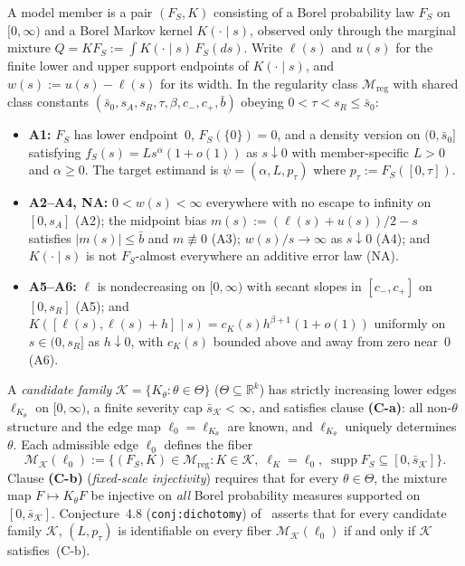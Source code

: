 \documentclass[11pt]{article}
\theoremstyle{plain}
\theoremstyle{definition}
\theoremstyle{remark}
\DeclareMathOperator{\supp}{supp}
\newcommand{\Mreg}{\mathcal{M}_{\mathrm{reg}}}
\begin{document}
A model member is a pair $(F_S, K)$ consisting of a Borel probability law $F_S$ on $[0, \infty)$ and a Borel Markov kernel $K(\cdot \mid s)$, observed only through the marginal mixture $Q = K F_S := \int K(\cdot \mid s)\,F_S(ds)$.
Write $\ell(s)$ and $u(s)$ for the finite lower and upper support endpoints of $K(\cdot \mid s)$, and $w(s) := u(s) - \ell(s)$ for its width.
In the regularity class $\Mreg$ with shared class constants $(\bar s_0, s_A, s_R, \tau, \beta, c_-, c_+, \bar b)$ obeying $0 < \tau < s_R \le \bar s_0$:
\begin{itemize}[leftmargin=1.6em]
\item \textbf{A1:} $F_S$ has lower endpoint~$0$, $F_S(\{0\}) = 0$, and a density version on $(0, \bar s_0]$ satisfying $f_S(s) = L s^\alpha(1 + o(1))$ as $s \downarrow 0$ with member-specific $L > 0$ and $\alpha \ge 0$. The target estimand is $\psi = (\alpha, L, p_\tau)$ where $p_\tau := F_S([0, \tau])$.
\item \textbf{A2--A4, NA:} $0 < w(s) < \infty$ everywhere with no escape to infinity on $[0, s_A]$ (A2); the midpoint bias $m(s) := (\ell(s) + u(s))/2 - s$ satisfies $|m(s)| \le \bar b$ and $m \not\equiv 0$ (A3); $w(s)/s \to \infty$ as $s \downarrow 0$ (A4); and $K(\cdot \mid s)$ is not $F_S$-almost everywhere an additive error law (NA).
\item \textbf{A5--A6:} $\ell$ is nondecreasing on $[0, \infty)$ with secant slopes in $[c_-, c_+]$ on $[0, s_R]$ (A5); and $K([\ell(s), \ell(s) + h] \mid s) = c_K(s) h^{\beta+1}(1 + o(1))$ uniformly on $s \in (0, s_R]$ as $h \downarrow 0$, with $c_K(s)$ bounded above and away from zero near~$0$ (A6).
\end{itemize}

A \emph{candidate family} $\mathcal{K} = \{K_\theta : \theta \in \Theta\}$ ($\Theta \subseteq \mathbb{R}^k$) has strictly increasing lower edges $\ell_{K_\theta}$ on $[0, \infty)$, a finite severity cap $\bar s_{\mathcal{K}} < \infty$, and satisfies clause \textbf{(C-a)}: all non-$\theta$ structure and the edge map $\ell_0 = \ell_{K_\theta}$ are known, and $\ell_{K_\theta}$ uniquely determines $\theta$.
Each admissible edge $\ell_0$ defines the fiber
\[
\mathcal{M}_{\mathcal{K}}(\ell_0) := \bigl\{(F_S, K) \in \Mreg : K \in \mathcal{K},\; \ell_K = \ell_0,\; \supp F_S \subseteq [0, \bar s_{\mathcal{K}}]\bigr\}.
\]
Clause \textbf{(C-b)} (\emph{fixed-scale injectivity}) requires that for every $\theta \in \Theta$, the mixture map $F \mapsto K_\theta F$ be injective on \emph{all} Borel probability measures supported on $[0, \bar s_{\mathcal{K}}]$.
Conjecture~4.8 (\texttt{conj:dichotomy}) of~\cite{Qi2026} asserts that for every candidate family $\mathcal{K}$, $(L, p_\tau)$ is identifiable on every fiber $\mathcal{M}_{\mathcal{K}}(\ell_0)$ if and only if $\mathcal{K}$ satisfies~\textup{(C-b)}.
\end{document}
